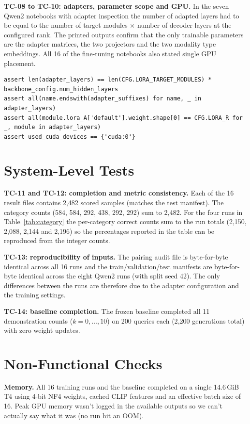 \documentclass[12pt]{report}
\begin{document}
\textbf{TC-08 to TC-10: adapters, parameter scope and GPU.} In the seven Qwen2 notebooks with adapter inspection the number of adapted layers had to be equal to the number of target modules $\times$ number of decoder layers at the configured rank. The printed outputs confirm that the only trainable parameters are the adapter matrices, the two projectors and the two modality type embeddings. All 16 of the fine-tuning notebooks also stated single GPU placement.
\begin{lstlisting}
assert len(adapter_layers) == len(CFG.LORA_TARGET_MODULES) * backbone_config.num_hidden_layers
assert all(name.endswith(adapter_suffixes) for name, _ in adapter_layers)
assert all(module.lora_A['default'].weight.shape[0] == CFG.LORA_R for _, module in adapter_layers)
assert used_cuda_devices == {'cuda:0'}
\end{lstlisting}

\section{System-Level Tests}
\textbf{TC-11 and TC-12: completion and metric consistency.} Each of the 16 result files contains 2,482 scored samples (matches the test manifest). The category counts (584, 584, 292, 438, 292, 292) sum to 2,482. For the four runs in Table~\ref{tab:category} the per-category correct counts sum to the run totals (2,150, 2,088, 2,144 and 2,196) so the percentages reported in the table can be reproduced from the integer counts.

\textbf{TC-13: reproducibility of inputs.} The pairing audit file is byte-for-byte identical across all 16 runs and the train/validation/test manifests are byte-for-byte identical across the eight Qwen2 runs (with split seed 42). The only differences between the runs are therefore due to the adapter configuration and the training settings.

\textbf{TC-14: baseline completion.} The frozen baseline completed all 11 demonstration counts ($k=0,\dots,10$) on 200 queries each (2{,}200 generations total) with zero weight updates.

\section{Non-Functional Checks}
\textbf{Memory.} All 16 training runs and the baseline completed on a single 14.6\,GiB T4 using 4-bit NF4 weights, cached CLIP features and an effective batch size of 16. Peak GPU memory wasn't logged in the available outputs so we can't actually say what it was (no run hit an OOM).
\end{document}
